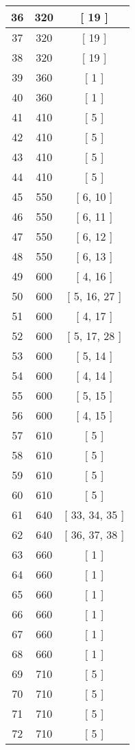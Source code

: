 \begin{center}
\begin{longtable}[H]{|| c c c ||}
\hline
36 & 320 & [ 19 ] \\ 
\hline
37 & 320 & [ 19 ] \\ 
\hline
38 & 320 & [ 19 ] \\ 
\hline
39 & 360 & [ 1 ] \\ 
\hline
40 & 360 & [ 1 ] \\ 
\hline
41 & 410 & [ 5 ] \\ 
\hline
42 & 410 & [ 5 ] \\ 
\hline
43 & 410 & [ 5 ] \\ 
\hline
44 & 410 & [ 5 ] \\ 
\hline
45 & 550 & [ 6, 10 ] \\ 
\hline
46 & 550 & [ 6, 11 ] \\ 
\hline
47 & 550 & [ 6, 12 ] \\ 
\hline
48 & 550 & [ 6, 13 ] \\ 
\hline
49 & 600 & [ 4, 16 ] \\ 
\hline
50 & 600 & [ 5, 16, 27 ] \\ 
\hline
51 & 600 & [ 4, 17 ] \\ 
\hline
52 & 600 & [ 5, 17, 28 ] \\ 
\hline
53 & 600 & [ 5, 14 ] \\ 
\hline
54 & 600 & [ 4, 14 ] \\ 
\hline
55 & 600 & [ 5, 15 ] \\ 
\hline
56 & 600 & [ 4, 15 ] \\ 
\hline
57 & 610 & [ 5 ] \\ 
\hline
58 & 610 & [ 5 ] \\ 
\hline
59 & 610 & [ 5 ] \\ 
\hline
60 & 610 & [ 5 ] \\ 
\hline
61 & 640 & [ 33, 34, 35 ] \\ 
\hline
62 & 640 & [ 36, 37, 38 ] \\ 
\hline
63 & 660 & [ 1 ] \\ 
\hline
64 & 660 & [ 1 ] \\ 
\hline
65 & 660 & [ 1 ] \\ 
\hline
66 & 660 & [ 1 ] \\ 
\hline
67 & 660 & [ 1 ] \\ 
\hline
68 & 660 & [ 1 ] \\ 
\hline
69 & 710 & [ 5 ] \\ 
\hline
70 & 710 & [ 5 ] \\ 
\hline
71 & 710 & [ 5 ] \\ 
\hline
72 & 710 & [ 5 ] \\ 
\hline

\end{longtable}
\end{center}

